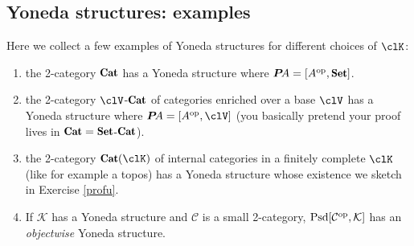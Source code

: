 \subsection{Yoneda structures: examples} Here we collect a few examples of
Yoneda structures for different choices of $\clK$:
\begin{enumerate}
	\item the 2-category $\Cat$ has a Yoneda structure where $\P A =
[A^\opp,\Set]$.
	\item the 2-category $\clV$-$\Cat$ of categories enriched over a base $\clV$
has a Yoneda structure where $\P A = [A^\opp,\clV]$ (you basically pretend your
proof lives in $\Cat = \Set$-$\Cat$).
	\item the 2-category $\Cat(\clK)$ of internal categories in a finitely
complete $\clK$ (like for example a topos) has a Yoneda structure whose
existence we sketch in Exercise \ref{profu}.
	\item If $\mathcal K$ has a Yoneda structure and $\mathcal C$ is a small
2-category, $\text{Psd}[\mathcal{C}^{\text{op}}, \mathcal K]$ has an \emph{objectwise}
Yoneda structure.
\end{enumerate}
